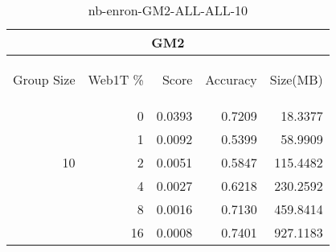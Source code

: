 \begin{center}
\begin{table}[htbp]
\begin{tabular}{ | r | r | r | r | r |}
\hline
\multicolumn{5}{|c|}{GM2}\\
\hline
\begin{sideways}Group Size\end{sideways} & \begin{sideways}Web1T \%\end{sideways} & \begin{sideways}Score\end{sideways} & \begin{sideways}Accuracy\end{sideways} & \begin{sideways}Size(MB)\end{sideways}\\
\hline
\multirow{5}{*}{10}
 & 0 & 0.0393 & 0.7209 & 18.3377\\ \cline{2-5}
 & 1 & 0.0092 & 0.5399 & 58.9909\\ \cline{2-5}
 & 2 & 0.0051 & 0.5847 & 115.4482\\ \cline{2-5}
 & 4 & 0.0027 & 0.6218 & 230.2592\\ \cline{2-5}
 & 8 & 0.0016 & 0.7130 & 459.8414\\ \cline{2-5}
 & 16 & 0.0008 & 0.7401 & 927.1183\\ \cline{2-5}
\hline
\end{tabular}
\caption{nb-enron-GM2-ALL-ALL-10}
\label{table:nb-enron-GM2-ALL-ALL-10}
\end{table}
\end{center}

